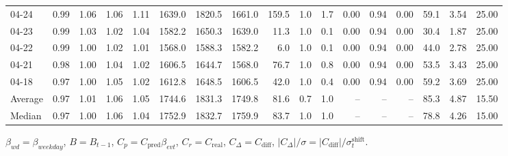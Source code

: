 \begin{threeparttable}
{\begin{tabular}{lrrrrrrrrrrrrrrrr}
  04-24 &         0.99 &           1.06 &          1.06 &          1.11 & 1639.0 & 1820.5 & 1661.0 &      159.5 &                      1.0 &                 1.7 &       0.00 &      0.94 &           0.00 &             59.1 &            3.54 &                  25.00 \\
  04-23 &         0.99 &           1.03 &          1.02 &          1.04 & 1582.2 & 1650.3 & 1639.0 &       11.3 &                      1.0 &                 0.1 &       0.00 &      0.94 &           0.00 &             30.4 &            1.87 &                  25.00 \\
  04-22 &         0.99 &           1.00 &          1.02 &          1.01 & 1568.0 & 1588.3 & 1582.2 &        6.0 &                      1.0 &                 0.1 &       0.00 &      0.94 &           0.00 &             44.0 &            2.78 &                  25.00 \\
  04-21 &         0.98 &           1.00 &          1.04 &          1.02 & 1606.5 & 1644.7 & 1568.0 &       76.7 &                      1.0 &                 0.8 &       0.00 &      0.94 &           0.00 &             53.5 &            3.43 &                  25.00 \\
  04-18 &         0.97 &           1.00 &          1.05 &          1.02 & 1612.8 & 1648.5 & 1606.5 &       42.0 &                      1.0 &                 0.4 &       0.00 &      0.94 &           0.00 &             59.2 &            3.69 &                  25.00 \\
Average &         0.97 &           1.01 &          1.06 &          1.05 & 1744.6 & 1831.3 & 1749.8 &       81.6 &                      0.7 &                 1.0 &         -- &        -- &             -- &             85.3 &            4.87 &                  15.50 \\
 Median &         0.97 &           1.00 &          1.06 &          1.04 & 1752.9 & 1832.7 & 1759.9 &       83.7 &                      1.0 &                 1.0 &         -- &        -- &             -- &             78.8 &            4.26 &                  15.00 \\
\bottomrule
\end{tabular}
}
\begin{tablenotes}\footnotesize
\item $\beta_{wd}=\beta_{weekday}$, $B=B_{t-1}$,
$C_p=C_{\text{pred}}\beta_{evt}$, $C_r=C_{\text{real}}$,
$C_\Delta=C_{\text{diff}}$, $|C_\Delta|/\sigma=|C_{\text{diff}}|/\sigma_t^{\text{shift}}$.
\end{tablenotes}
\end{threeparttable}
\endgroup
